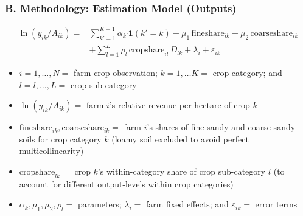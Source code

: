 \documentclass[t,24pt,aspectratio=169]{beamer}
\begin{document}
\begin{frame}[hvid]
\frametitle{\vspace{-3ex}B. Methodology: Estimation Model (Outputs)}
\vspace{-5.5ex} \begin{align*}
     \ln(y_{ik}/A_{ik}) = & \sum_{k'=1}^{K-1} \alpha_{k'} \mathbf{1}(k'=k) + \mu_1\,\text{fineshare}_{ik} + \mu_2\,\text{coarseshare}_{ik} \\
    &+ \sum_{l=1}^{L} \rho_l\,\text{cropshare}_{il}\,D_{lk} 
    + \lambda_i + \varepsilon_{ik}
\end{align*}
\vspace{-2ex}\begin{itemize}
\item $i = 1, \ldots, N =$ farm-crop observation; $k = 1, \ldots K =$ crop category; and $l = l, \ldots, L =$ crop sub-category

\item $\ln (y_{ik} / A_{ik}) =$ farm $i$'s relative revenue per hectare of crop $k$

\item $\text{fineshare}_{ik}, \text{coarseshare}_{ik} =$ farm $i$’s shares of fine sandy and coarse sandy soils for crop category $k$ (loamy soil excluded to avoid perfect multicollinearity) 

\item $\text{cropshare}_{lk} =$ crop $k$'s within-category share of crop sub-category $l$ (to account for different output-levels within crop categories)

\item $\alpha_k, \mu_1, \mu_2, \rho_l =$ parameters; $\lambda_i =$ farm fixed effects; and $\varepsilon_{ik} =$ error terms
\end{itemize}

\end{frame}
\end{document}
